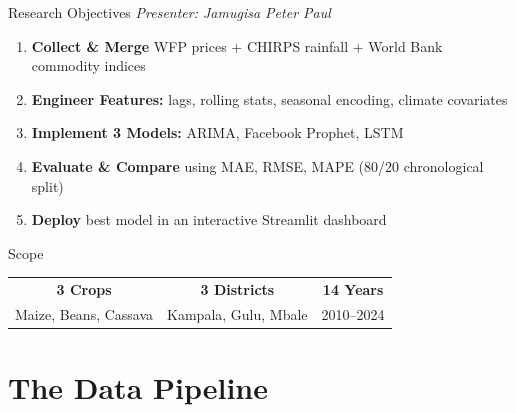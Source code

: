 \documentclass[aspectratio=169,11pt]{beamer}
\begin{document}
\begin{frame}{Research Objectives}
\textit{\small Presenter: Jamugisa Peter Paul}
\begin{enumerate}
    \item \textbf{Collect \& Merge} WFP prices + CHIRPS rainfall + World Bank commodity indices
    \item \textbf{Engineer Features:} lags, rolling stats, seasonal encoding, climate covariates
    \item \textbf{Implement 3 Models:} ARIMA, Facebook Prophet, LSTM
    \item \textbf{Evaluate \& Compare} using MAE, RMSE, MAPE (80/20 chronological split)
    \item \textbf{Deploy} best model in an interactive Streamlit dashboard
\end{enumerate}
\vspace{0.5em}
\begin{block}{Scope}
\centering
\begin{tabular}{ccc}
\textbf{3 Crops} & \textbf{3 Districts} & \textbf{14 Years} \\
Maize, Beans, Cassava & Kampala, Gulu, Mbale & 2010--2024 \\
\end{tabular}
\end{block}
\end{frame}

\section{The Data Pipeline}
\end{document}
